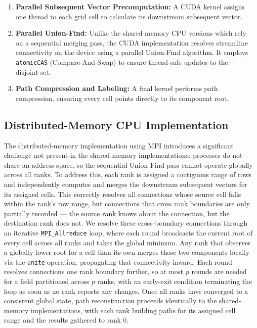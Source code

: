 \begin{enumerate}
	\item \textbf{Parallel Subsequent Vector Precomputation:} A CUDA kernel assigns one thread to each grid cell to calculate its downstream subsequent vector.
	\item \textbf{Parallel Union-Find:} Unlike the shared-memory CPU versions which rely on a sequential merging pass, the CUDA implementation resolves streamline connectivity on the device using a parallel Union-Find algorithm. It employs \texttt{atomicCAS} (Compare-And-Swap) to ensure thread-safe updates to the disjoint-set.
	\item \textbf{Path Compression and Labeling:} A final kernel performs path compression, ensuring every cell points directly to its component root.
\end{enumerate}


\subsection{Distributed-Memory CPU Implementation}

The distributed-memory implementation using MPI introduces a significant challenge not present in the shared-memory implementations: processes do not share an address space, so the sequential Union-Find pass cannot operate globally across all ranks.
To address this, each rank is assigned a contiguous range of rows and independently computes and merges the downstream subsequent vectors for its assigned cells.
This correctly resolves all connections whose source cell falls within the rank's row range, but connections that cross rank boundaries are only partially recorded --- the source rank knows about the connection, but the destination rank does not.
We resolve these cross-boundary connections through an iterative \texttt{MPI\_Allreduce} loop, where each round broadcasts the current root of every cell across all ranks and takes the global minimum.
Any rank that observes a globally lower root for a cell than its own merges those two components locally via the \texttt{unite} operation, propagating that connectivity inward.
Each round resolves connections one rank boundary further, so at most $p$ rounds are needed for a field partitioned across $p$ ranks, with an early-exit condition terminating the loop as soon as no rank reports any changes.
Once all ranks have converged to a consistent global state, path reconstruction proceeds identically to the shared-memory implementations, with each rank building paths for its assigned cell range and the results gathered to rank 0.

